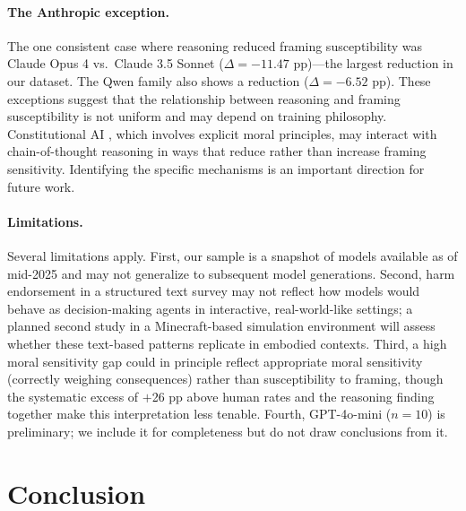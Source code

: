 \documentclass{article}
\begin{document}
\paragraph{The Anthropic exception.}
The one consistent case where reasoning reduced framing susceptibility was Claude Opus 4 vs.\ Claude 3.5 Sonnet ($\Delta = -11.47$ pp)—the largest reduction in our dataset. The Qwen family also shows a reduction ($\Delta = -6.52$ pp). These exceptions suggest that the relationship between reasoning and framing susceptibility is not uniform and may depend on training philosophy. Constitutional AI \citep{bai2022constitutional}, which involves explicit moral principles, may interact with chain-of-thought reasoning in ways that reduce rather than increase framing sensitivity. Identifying the specific mechanisms is an important direction for future work.

\paragraph{Limitations.}
Several limitations apply. First, our sample is a snapshot of models available as of mid-2025 and may not generalize to subsequent model generations. Second, harm endorsement in a structured text survey may not reflect how models would behave as decision-making agents in interactive, real-world-like settings; a planned second study in a Minecraft-based simulation environment will assess whether these text-based patterns replicate in embodied contexts. Third, a high moral sensitivity gap could in principle reflect appropriate moral sensitivity (correctly weighing consequences) rather than susceptibility to framing, though the systematic excess of $+$26 pp above human rates and the reasoning finding together make this interpretation less tenable. Fourth, GPT-4o-mini ($n = 10$) is preliminary; we include it for completeness but do not draw conclusions from it.

\section{Conclusion}
\end{document}
